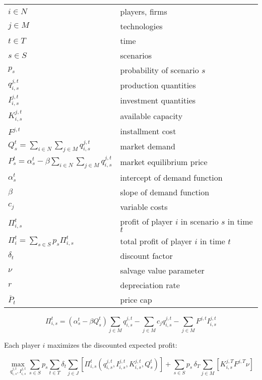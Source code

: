 \begin{longtable}[l]{l l}
$i \in N$ & players, firms \\
$j \in M$ & technologies \\
$t \in T$ & time \\
$s \in S$ & scenarios \\
$p_s$ & probability of scenario $s$\\
$ q_{i,s}^{j,t}$ & production quantities \\
$I_{i,s}^{j,t}$ & investment quantities \\
$K_{i,s}^{j,t}$ & available capacity\\
$F^{j,t}$ & installment cost\\
$Q_s^t = \sum_{i\in N}\sum_{j\in M} q_{i,s}^{j,t}$ & market demand \\
$P_s^t = \alpha_s^t-\beta\sum_{i\in N}\sum_{j\in M}q_{i,s}^{j,t}$ & market equilibrium price \\
$\alpha_s^t$ & intercept of demand function \\
$\beta$ & slope of demand function \\
$c_j$ & variable costs \\
$\Pi_{i,s}^t$ & profit of player $i$ in scenario $s$ in time $t$\\
$\Pi_i^t = \sum_{s\in S}p_s\Pi_{i,s}^t$ & total profit of player $i$ in time $t$\\
$\delta_t$ & discount factor \\
$\nu$ & salvage value parameter\\
$r$ & depreciation rate\\
$\overline{P}_t$ & price cap\\ 

\end{longtable}

\begin{equation}
\Pi_{i,s}^t = \left(\alpha_s^t-\beta Q_s^t \right)\sum_{j\in M}q_{i,s}^{j,t}-\sum_{j\in M}c_jq_{i,s}^{j,t}-\sum_{j\in M}F^{j,t}I_{i,s}^{j,t}
\end{equation}

Each player $i$ maximizes the discounted expected profit:

\begin{equation}
  \label{eq:objfct}
  \max_{q_{i,s}^{j,t}, I_{i,s}^{j,t}} \sum_{s\in S}p_s \sum_{t\in T}\delta_t \sum_{j\in J}\left[\Pi_{i,s}^t\left(q_{i,s}^{j,t}, I_{i,s}^{j,t}, K_{i,s}^{j,t}, Q_s^t\right) \right ]+ \sum_{s\in S}p_s\,\delta_T \sum_{j\in M}\left[K_{i,s}^{j,T}F^{j,T}\nu\right]
\end{equation}

